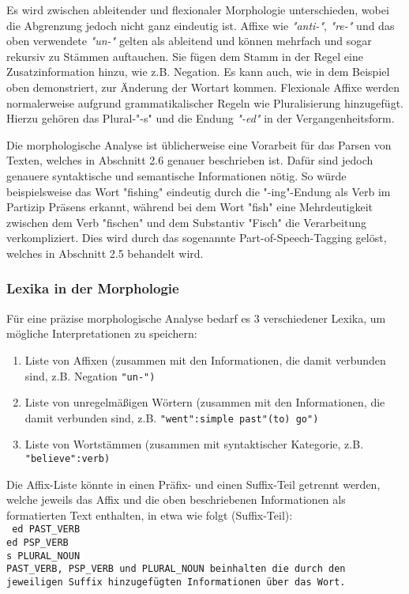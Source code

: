 \documentclass[12pt]{paper}
\begin{document}
Es wird zwischen ableitender und flexionaler Morphologie unterschieden, wobei die Abgrenzung jedoch nicht ganz eindeutig ist. Affixe wie \textit{"anti-"}, \textit{"re-"} und das oben verwendete \textit{"un-"} gelten als ableitend und können mehrfach und sogar rekursiv zu Stämmen auftauchen. Sie fügen dem Stamm in der Regel eine Zusatzinformation hinzu, wie z.B. Negation. Es kann auch, wie in dem Beispiel oben demonstriert, zur Änderung der Wortart kommen. Flexionale Affixe werden normalerweise aufgrund grammatikalischer Regeln wie Pluralisierung hinzugefügt. Hierzu gehören das Plural-"-s" und die Endung \textit{"-ed"} in der Vergangenheitsform. 

Die morphologische Analyse ist üblicherweise eine Vorarbeit für das Parsen von Texten, welches in Abschnitt 2.6 genauer beschrieben ist. Dafür sind jedoch genauere syntaktische und semantische Informationen nötig. So würde beispielsweise das Wort "fishing" eindeutig durch die "-ing"-Endung als Verb im Partizip Präsens erkannt, während bei dem Wort "fish" eine Mehrdeutigkeit zwischen dem Verb "fischen" und dem Substantiv "Fisch" die Verarbeitung verkompliziert. Dies wird durch das sogenannte Part-of-Speech-Tagging gelöst, welches in Abschnitt 2.5 behandelt wird.

\subsubsection{Lexika in der Morphologie}
Für eine präzise morphologische Analyse bedarf es 3 verschiedener Lexika, um mögliche Interpretationen zu speichern:

\begin{enumerate}
\item Liste von Affixen (zusammen mit den Informationen, die damit verbunden sind, z.B. Negation \tt "un-"\rm)
\item Liste von unregelmäßigen Wörtern (zusammen mit den Informationen, die damit verbunden sind, z.B. \tt "went":simple past"(to) go"\rm)
\item Liste von Wortstämmen (zusammen mit syntaktischer Kategorie, z.B. \tt "believe":verb\rm)
\end{enumerate}

Die Affix-Liste könnte in einen Präfix- und einen Suffix-Teil getrennt werden, welche jeweils das Affix und die oben beschriebenen Informationen als formatierten Text enthalten, in etwa wie folgt (Suffix-Teil):
\\
\tt
ed PAST\_VERB\\
ed PSP\_VERB\\
s PLURAL\_NOUN\\
\rm
PAST\_VERB, PSP\_VERB und PLURAL\_NOUN beinhalten die durch den jeweiligen Suffix hinzugefügten Informationen über das Wort. 
\end{document}
